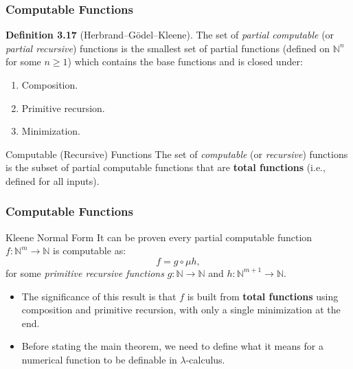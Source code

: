 \documentclass{beamer}
\begin{document}
\begin{frame}
  \frametitle{Computable Functions}

  \begin{definition}
    \textbf{Definition 3.17} (Herbrand–Gödel–Kleene). The set of \textit{partial computable} (or \textit{partial recursive}) functions is the smallest set of partial functions (defined on \( \mathbb{N}^n \) for some \( n \geq 1 \)) which contains the base functions and is closed under:
    \begin{enumerate}
      \item Composition.
      \item Primitive recursion.
      \item Minimization.
    \end{enumerate}
  \end{definition}

  \begin{block}{Computable (Recursive) Functions}
    The set of \textit{computable} (or \textit{recursive}) functions is the subset of partial computable functions that are \textbf{total functions} (i.e., defined for all inputs).
  \end{block}
\end{frame}

\begin{frame}
  \frametitle{Computable Functions}
  \begin{block}{Kleene Normal Form}
    It can be proven every partial computable function \( f: \mathbb{N}^m \to \mathbb{N} \) is computable as:
    \[
      f = g \circ \mu h,
    \]
    for some \textit{primitive recursive functions} \( g: \mathbb{N} \to \mathbb{N} \) and \( h: \mathbb{N}^{m+1} \to \mathbb{N} \).
  \end{block}

  \begin{itemize}
    \item The significance of this result is that \( f \) is built from \textbf{total functions} using composition and primitive recursion, with only a single minimization at the end.
    \item Before stating the main theorem, we need to define what it means for a numerical function to be definable in \( \lambda \)-calculus.
  \end{itemize}

\end{frame}
\end{document}
